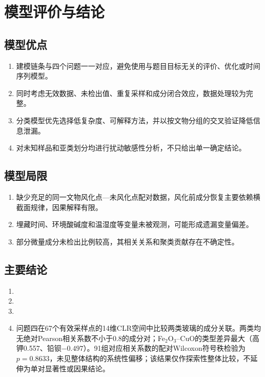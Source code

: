 \section{模型评价与结论}

\subsection{模型优点}
\begin{enumerate}
  \item 建模链条与四个问题一一对应，避免使用与题目目标无关的评价、优化或时间序列模型。
  \item 同时考虑无效数据、未检出值、重复采样和成分闭合效应，数据处理较为完整。
  \item 分类模型优先选择低复杂度、可解释方法，并以按文物分组的交叉验证降低信息泄漏。
  \item 对未知样品和亚类划分均进行扰动敏感性分析，不只给出单一确定结论。
\end{enumerate}

\subsection{模型局限}
\begin{enumerate}
  \item 缺少充足的同一文物风化点—未风化点配对数据，风化前成分恢复主要依赖横截面规律，因果解释有限。
  \item 埋藏时间、环境酸碱度和温湿度等变量未被观测，可能形成遗漏变量偏差。
  \item 部分微量成分未检出比例较高，其相关关系和聚类贡献存在不确定性。
\end{enumerate}

\subsection{主要结论}
\begin{enumerate}
  \item {}
  \item {}
  \item {}
  \item 问题四在67个有效采样点的14维CLR空间中比较两类玻璃的成分关联。两类均无绝对Pearson相关系数不小于0.8的成分对；Fe$_2$O$_3$--CuO的类型差异最大（高钾0.557、铅钡\(-0.497\)）。91组对应相关系数的配对Wilcoxon符号秩检验为\(p=0.8633\)，未见整体结构的系统性偏移；该结果仅作探索性整体比较，不延伸为单对显著性或因果结论。
\end{enumerate}
